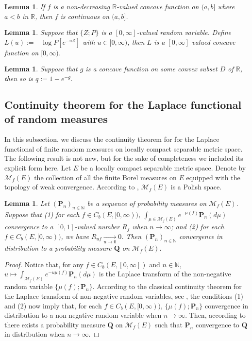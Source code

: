 \documentclass[12pt,a4paper]{amsart}
\numberwithin{equation}{section}
\theoremstyle{plain}
\newtheorem{lem}[thm]{Lemma}
\theoremstyle{definition}
\theoremstyle{remark}
\begin{document}
\begin{lem} \label{Fact:CR!}
	If $f$ is a non-decreasing $\mathbb R$-valued concave function on $(a,b]$ where $a<b$ in $\mathbb R$, then $f$ is continuous on $(a,b]$.
\end{lem}


\begin{lem} \label{Fact:CP!}
	Suppose that $\{Z; P\}$ is a $[0,\infty]$-valued random variable.
	Define $L(u):= - \log P[e^{- u Z}]$ with $u \in [0,\infty)$, then $L$ is a $[0,\infty]$-valued concave function on $[0,\infty)$.
\end{lem}

\begin{lem} \label{Fact:CE!}
	Suppose that $g$ is a concave function on some convex subset $D$ of $\mathbb R$, then so is $q:= 1- e^{-g}.$
\end{lem}

\subsection{Continuity theorem for the Laplace functional of random measures}
	In this subsection, we discuss the continuity theorem for for the Laplace functional of finite random measures on locally compact separable metric space.	
	The following result is not new, but for the sake of completeness we included its explicit form here.
	Let $E$ be a locally compact separable metric space. 
	Denote by $\mathcal M_f(E)$ the collection of all the finite Borel measures on $E$ equipped with the topology of weak convergence.
	According to \cite[Lemma 4.5]{Kallenberg2017Random}, $\mathcal M_f(E)$ is a Polish space.
\begin{lem} \label{fact:WC}
	Let $(\mathbf P_n)_{n\in \mathbb N}$ be a sequence of probability measures on $\mathcal M_f(E)$. 
	Suppose that (1) for each $f \in C_b(E,[0,\infty))$, $\int_{\mu \in \mathcal M_f(E)} e^{-\mu(f)} \mathbf P_n(d\mu)$ convergence to a $[0,1]$-valued number $R_f$ when $n\to \infty$; and (2) for each $f \in C_b(E,[0,\infty))$, we have $R_{u f} \xrightarrow[u \to 0]{} 0$.
	Then $(\mathbf P_n)_{n \in \mathbb N}$ convergence in distribution to a probability measure $\mathbf Q$ on $\mathcal M_f(E)$.
\end{lem}
\begin{proof}
	Notice that, for any $f\in C_b(E,[0,\infty])$ and $n\in \mathbb N$, $u \mapsto \int_{\mathcal M_f(E)} e^{- u\mu(f)} \mathbf P_n(d\mu)$ is the Laplace transform of the non-negative random variable $\{\mu(f); \mathbf P_n\}$. 
	According to the classical continuity theorem for the Laplace transform of non-negative random variables, see \cite[Theorem 5.22]{Kallenberg2002Foundations}, the conditions (1) and (2) now imply that, for each $f \in C_b(E,[0,\infty))$, $\{ \mu(f); \mathbf P_n\}$ convergence in distribution to a non-negative random variable when $n\to \infty$.
	Then, according to \cite[Corollary 4.14 and Theorem 4.19]{Kallenberg2017Random} there exists a probability measure $\mathbf Q$ on $\mathcal M_f(E)$ such that $\mathbf P_n$ convergence to $\mathbf Q$ in distribution when $n\to \infty$.
\end{proof}
\end{document}
